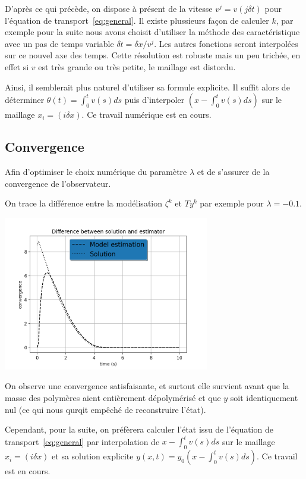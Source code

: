 \documentclass[a4paper]{article}
\begin{document}
D'après ce qui précède, on dispose à présent de la vitesse $v^j = v(j \delta t)$ pour l'équation de transport~\eqref{eq:general}. 
Il existe plussieurs façon de calculer $k$, par exemple pour la suite nous avons choisit d'utiliser la méthode des caractéristique
avec un pas de temps variable $\delta t = \delta x / v^j$. Les autres fonctions seront interpolées sur ce nouvel axe des temps. 
Cette résolution est robuste mais un peu trichée, en effet si $v$ est très grande ou très petite, le maillage est distordu.


Ainsi, il semblerait plus naturel d'utiliser sa formule explicite. Il suffit alors de déterminer $\theta(t) = \int_0^t v(s)ds $ puis d'interpoler $(x- \int_0^t v(s)ds)$ sur le maillage $ x_i =(i \delta x)$. Ce travail numérique est en cours.



\subsection{Convergence}

Afin d'optimiser le choix numérique du paramètre $\lambda$ 
et de s'assurer de la convergence de l'observateur.


On trace la différence entre la modélisation $\zeta^k$ et $Ty^k$ par exemple pour $\lambda = -0.1$.

\includegraphics[width=9cm]{figures/Transformation.png}

On observe une convergence satisfaisante, 
et surtout elle survient avant que la masse des polymères aient entièrement dépolymérisé 
et que $y$ soit identiquement nul (ce qui nous qurqit empêché de reconstruire l'état).

Cependant, pour la suite, on préfèrera calculer l'état issu de l'équation de transport~\eqref{eq:general} 
par interpolation de $x- \int_0^t v(s)ds$ sur le maillage $ x_i =(i \delta x)$
et sa solution explicite $y(x,t) = y_0(x- \int_0^t v(s)ds)$.
Ce travail est en cours.
\end{document}
